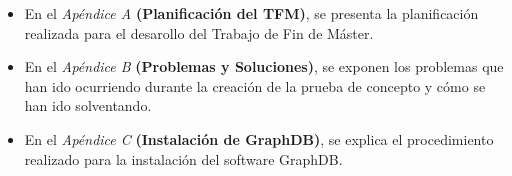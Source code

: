 \begin{itemize}
	\item En el \textit{Apéndice A} \textbf{(Planificación del TFM)}, se presenta la planificación realizada para el desarollo del Trabajo de Fin de Máster.
	
	
	
	\item En el \textit{Apéndice B} \textbf{(Problemas y Soluciones)}, se exponen los problemas que han ido ocurriendo durante la creación de la prueba de concepto y cómo se han ido solventando.
	
	\item En el \textit{Apéndice C} \textbf{(Instalación de GraphDB)}, se explica el procedimiento realizado para la instalación del software GraphDB.
		
	
			
	
\end{itemize}


